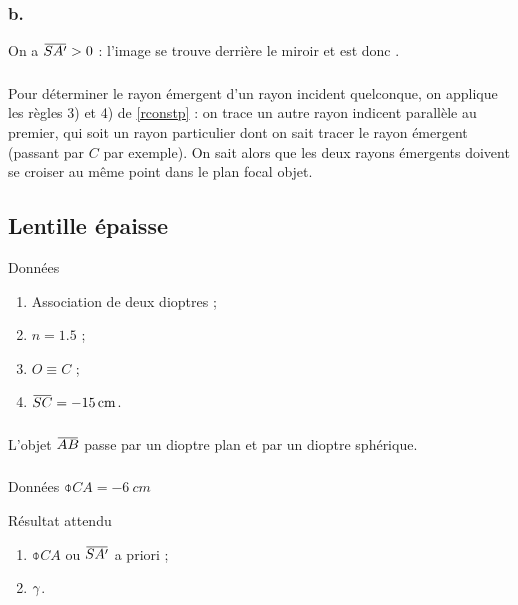 \documentclass[10pt,a5paper,notitlepage]{book}
\begin{document}
\setcounter{subsubsection}{1}
\subsubsection{b.}
On a $\SAp > 0$ : l'image se trouve derrière le miroir et est donc
.

\subsubsection{}
Pour déterminer le rayon émergent d'un rayon incident quelconque, on applique
les règles 3) et 4) de \ref{rconstp} : on trace un autre rayon indicent
parallèle au premier, qui soit un rayon particulier dont on sait tracer le rayon
émergent (passant par $C$ par exemple). On sait alors que les deux rayons
émergents doivent se croiser au même point dans le plan focal objet.

\subsection{Lentille épaisse}
\begin{vtcb}{Données}
    \begin{enumerate}
        \item Association de deux dioptres ;
        \item $n = 1.5$ ;
        \item $O \equiv C$ ;
        \item $\SC = \SI{-15}{cm}$.
    \end{enumerate}
\end{vtcb}

\subsubsection{}
L'objet $\ABb$ passe par un dioptre plan et par un dioptre sphérique.

\subsubsection{}
\begin{vtcb}{Données}
    $\obar{CA} = \SI{-6}{cm}$
\end{vtcb}

\begin{rtcb}{Résultat attendu}
    \begin{enumerate}
        \item $\obar{CA}$ ou $\SAp$ a priori ;
        \item $\gamma$.
    \end{enumerate}
\end{rtcb}
\end{document}
